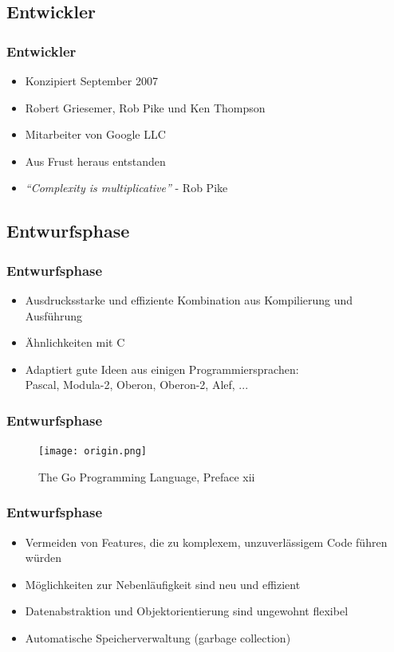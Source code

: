 \documentclass{beamer}
\begin{document}
\subsection{Entwickler}
\begin{frame}
\frametitle{Entwickler}

\begin{itemize}
\setlength{\itemsep}{24pt}
\item Konzipiert September 2007
\item Robert Griesemer, Rob Pike und Ken Thompson
\item Mitarbeiter von Google LLC \textregistered
\item Aus Frust heraus entstanden
\item \textit{``Complexity is multiplicative''} - Rob Pike
\end{itemize}

\end{frame}


\subsection{Entwurfsphase}
\begin{frame}
\frametitle{Entwurfsphase}

\begin{itemize}
\setlength{\itemsep}{20pt}
\item Ausdrucksstarke und effiziente Kombination aus Kompilierung und Ausf\"uhrung
\item Ähnlichkeiten mit C
\item Adaptiert gute Ideen aus einigen Programmiersprachen: \\
Pascal, Modula-2, Oberon, Oberon-2, Alef, ...
\end{itemize}

\end{frame}

\begin{frame}
\frametitle{Entwurfsphase}

\begin{figure}
\centering
\texttt{[image: origin.png]}
\caption{The Go Programming Language,  Preface xii}
\end{figure}

\end{frame}

\begin{frame}
\frametitle{Entwurfsphase}

\begin{itemize}
\setlength{\itemsep}{40pt}
\item Vermeiden von Features, die zu komplexem, unzuverl\"assigem Code führen w\"urden
\item M\"oglichkeiten zur Nebenl\"aufigkeit sind neu und effizient
\item Datenabstraktion und Objektorientierung sind ungewohnt flexibel
\item Automatische Speicherverwaltung (garbage collection)
\end{itemize}

\end{frame}
\end{document}

